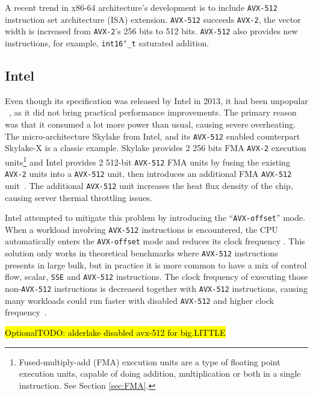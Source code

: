 \documentclass[logo,bsc,singlespacing,parskip]{infthesis}
\newcommand{\dtshort}{\texttt{int16\char`_t}}
\newcommand{\hlc}[2][yellow]{{%
    \colorlet{foo}{#1}%
    \sethlcolor{foo}\hl{#2}}%
}
\begin{document}
A recent trend in x86-64 architecture’s development is to include \texttt{AVX-512}
instruction set architecture (ISA) extension. \texttt{AVX-512} succeeds \texttt{AVX-2}, the vector
width is increased from \texttt{AVX-2}’s 256 bits to 512 bits. \texttt{AVX-512} also provides new
instructions, for example, \dtshort{} saturated addition.

\subsection{Intel}

Even though its specification was released by Intel in 2013, it had been
unpopular ~\cite{linusHopeAvx512Die}, as it did not bring practical performance
improvements. The primary reason was that it consumed a lot more power than
usual, causing severe overheating. The micro-architecture Skylake from Intel,
and its \texttt{AVX-512} enabled counterpart Skylake-X is a classic example.
Skylake provides 2 256 bits FMA \texttt{AVX-2} execution units\footnote{Fused-multiply-add (FMA) execution units are a type of floating point
execution units, capable of doing addition, multiplication or both in a single
instruction. See Section \ref{sec:FMA}.} and Intel provides 2 512-bit
\texttt{AVX-512} FMA units by fusing the existing \texttt{AVX-2}  units into a
\texttt{AVX-512} unit, then introduces an additional FMA \texttt{AVX-512}
unit~\cite{SLK-X}. The additional \texttt{AVX-512} unit increases the heat flux
density of the chip, causing server thermal throttling issues. 

Intel attempted to mitigate this problem by introducing the
``\texttt{AVX-offset}'' mode. When a workload involving \texttt{AVX-512}
instructions is encountered, the CPU automatically enters the
\texttt{AVX-offset} mode and reduces its clock frequency \cite{AVX-offset}. This
solution only works in theoretical benchmarks where \texttt{AVX-512}
instructions presents in large bulk, but in practice it is more common to have a
mix of control flow, scalar, \texttt{SSE} and \texttt{AVX-512} instructions. The
clock frequency of executing those non-\texttt{AVX-512} instructions is
decreased together with \texttt{AVX-512} instructions, causing many workloads
could run faster with disabled \texttt{AVX-512} and higher clock
frequency~\cite{Zen4Critique}. 

\hlc[pink]{OptionalTODO: alderlake disabled avx-512 for big.LITTLE}
\end{document}
